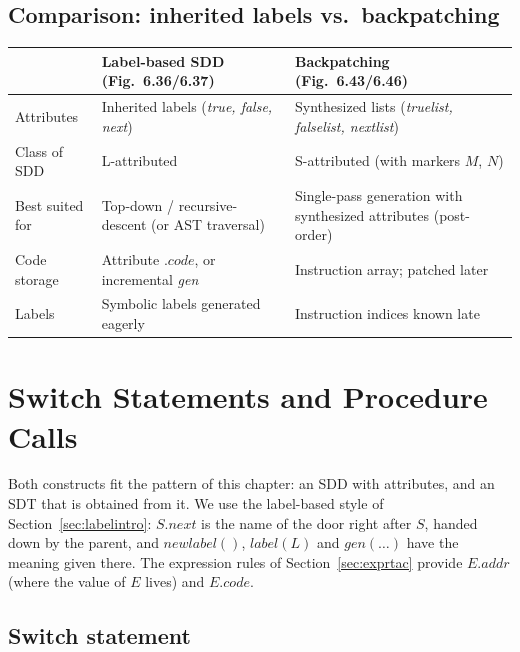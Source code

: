 \documentclass[11pt,a4paper]{article}
\newcommand{\at}[2]{\ensuremath{#1.\mathit{#2}}}
\begin{document}
\subsection{Comparison: inherited labels vs.\ backpatching}
\begin{center}
\small
\begin{tabular}{@{}L{3.3cm} L{5.6cm} L{5.6cm}@{}}
\toprule
 & \textbf{Label-based SDD (Fig.~6.36/6.37)} & \textbf{Backpatching (Fig.~6.43/6.46)} \\ \midrule
Attributes & Inherited labels (\textit{true, false, next}) & Synthesized lists (\textit{truelist, falselist, nextlist}) \\
Class of SDD & L-attributed & S-attributed (with markers $M$, $N$) \\
Best suited for & Top-down / recursive-descent (or AST traversal) & Single-pass generation with synthesized attributes (post-order) \\
Code storage & Attribute \at{}{code}, or incremental \textit{gen} & Instruction array; patched later \\
Labels & Symbolic labels generated eagerly & Instruction indices known late \\ \bottomrule
\end{tabular}
\end{center}

\section{Switch Statements and Procedure Calls}
\label{sec:switchcall}

Both constructs fit the pattern of this chapter: an SDD with attributes, and an SDT that is obtained from it. We use the label-based style of Section~\ref{sec:labelintro}: $\at{S}{next}$ is the name of the door right after $S$, handed down by the parent, and $\mathit{newlabel}()$, $\mathit{label}(L)$ and $\mathit{gen}(\dots)$ have the meaning given there. The expression rules of Section~\ref{sec:exprtac} provide $\at{E}{addr}$ (where the value of $E$ lives) and $\at{E}{code}$.

\subsection{Switch statement}
\label{sec:switch}
\end{document}
